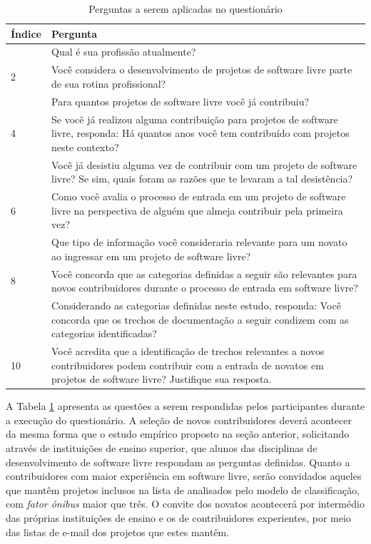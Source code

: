 \begin{table}
\caption{Perguntas a serem aplicadas no questionário}
\label{tab:questionario}
\centering
\small
\begin{tabularx}{\textwidth}{>{\hsize=0.075\hsize}X >{\hsize=0.925\hsize}X}
\midrule
\textbf{Índice} & \textbf{Pergunta} \\
\midrule
1 & Qual é sua profissão atualmente?
\\
\rowcolor{gray} 2 & Você considera o desenvolvimento de projetos de software livre parte de sua rotina profissional?
\\
3 &  Para quantos projetos de software livre você já contribuiu?
\\
\rowcolor{gray} 4 & Se você já realizou alguma contribuição para  projetos de software livre, responda: Há quantos anos você tem contribuído com projetos neste contexto?
\\
5 & Você já desistiu alguma vez de contribuir com um projeto de software livre? Se sim, quais foram as razões que te levaram a tal desistência?
\\
\rowcolor{gray} 6 & Como você avalia o processo de entrada em um projeto de software livre na perspectiva de alguém que almeja contribuir pela primeira vez?
\\
7 & Que tipo de informação você consideraria relevante para um novato ao ingressar em um projeto de software livre? 
\\
\rowcolor{gray} 8 & Você concorda que as categorias definidas a seguir são relevantes para novos contribuidores durante o processo de entrada em software livre?
\\
9 & Considerando as categorias definidas neste estudo, responda: Você concorda que os trechos de documentação a seguir condizem com as categorias identificadas?
\\
\rowcolor{gray} 10 & Você acredita que a identificação de trechos relevantes a novos contribuidores podem contribuir com a entrada de novatos em projetos de software livre? Justifique sua resposta.

\end{tabularx}
\end{table}

A Tabela \ref{tab:questionario} apresenta as questões a serem respondidas pelos participantes durante a execução do questionário. A seleção de novos contribuidores deverá acontecer da mesma forma que o estudo empírico proposto na seção anterior, solicitando através de instituições de ensino superior, que alunos das disciplinas de desenvolvimento de software livre respondam as perguntas definidas. Quanto a contribuidores com maior experiência em software livre, serão convidados aqueles que mantêm projetos inclusos na lista de analisados pelo modelo de classificação, com \textit{fator ônibus} maior que três. O convite dos novatos acontecerá por intermédio das próprias instituições de ensino e os de contribuidores experientes, por meio das listas de e-mail dos projetos que estes mantêm.

